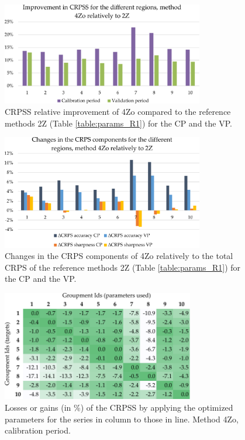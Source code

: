 \documentclass[review]{elsarticle}
\begin{document}
\begin{figure}[t]
	\centerline{\includegraphics[width=8.8cm]{figures/fig03.pdf}}
	\caption{CRPSS relative improvement of 4Zo compared to the reference methods 2Z (Table \ref{table:params_R1}) for the CP and the VP.}
	\label{fig:figure_dcrpss_4Zo}
\end{figure}

\begin{figure}[t]
	\centerline{\includegraphics[width=8.8cm]{figures/fig04.pdf}}
	\caption{Changes in the CRPS components of 4Zo relatively to the total CRPS of the reference methods 2Z (Table \ref{table:params_R1}) for the CP and the VP.}
	\label{fig:figure_dcrps_comp_4Zo}
\end{figure}

\begin{figure}[t]
	\centerline{\includegraphics[width=8.4cm]{figures/fig05.pdf}}
	\caption{Losses or gains (in \%) of the CRPSS by applying the optimized parameters for the series in column to those in line. Method 4Zo, calibration period.}
	\label{fig:crossing_4Zo_calib}
\end{figure}
\end{document}
